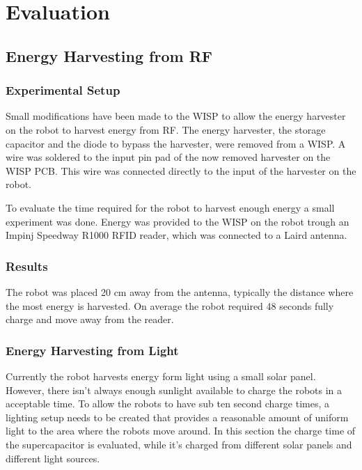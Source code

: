 \chapter{Evaluation} 


\section{Energy Harvesting from RF}


\subsection{Experimental Setup}

Small modifications have been made to the WISP to allow the energy harvester on the robot to harvest energy from RF.
The energy harvester, the storage capacitor and the diode to bypass the harvester, were removed from a WISP.
A wire was soldered to the input pin pad of the now removed harvester on the WISP PCB.
This wire was connected directly to the input of the harvester on the robot.

To evaluate the time required for the robot to harvest enough energy a small experiment was done.
Energy was provided to the WISP on the robot trough an Impinj Speedway R1000 RFID reader, which was connected to a Laird antenna.

\subsection{Results}
The robot was placed 20 cm away from the antenna, typically the distance where the most energy is harvested.
On average the robot required 48 seconds fully charge and move away from the reader.

\subsection{Energy Harvesting from Light}

Currently the robot harvests energy form light using a small solar panel.
However, there isn't always enough sunlight available to charge the robots in a acceptable time.
To allow the robots to have sub ten second charge times, a lighting setup needs to be created that provides a reasonable amount of uniform light to the area where the robots move around.
In this section the charge time of the supercapacitor is evaluated, while it's charged from different solar panels and different light sources.

